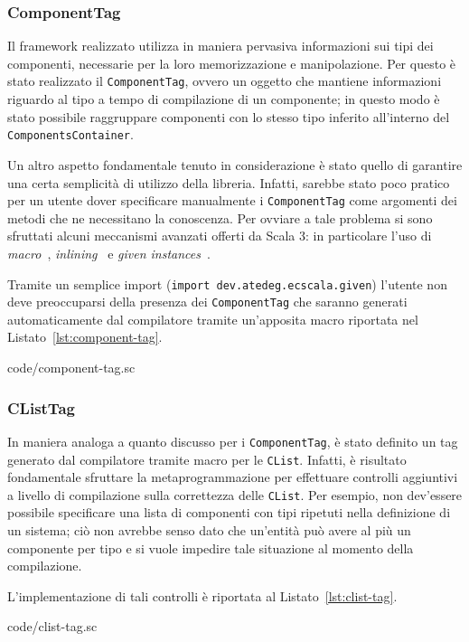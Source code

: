 \subsubsection{ComponentTag}
Il framework realizzato utilizza in maniera pervasiva informazioni sui tipi dei componenti, necessarie
per la loro memorizzazione e manipolazione.
Per questo è stato realizzato il \texttt{ComponentTag}, ovvero un oggetto che mantiene informazioni riguardo
al tipo a tempo di compilazione di un componente;
in questo modo è stato possibile raggruppare componenti con lo stesso tipo inferito all'interno del
\texttt{ComponentsContainer}.

Un altro aspetto fondamentale tenuto in considerazione è stato quello di garantire una certa semplicità di
utilizzo della libreria.
Infatti, sarebbe stato poco pratico per un utente dover specificare manualmente i \texttt{ComponentTag}
come argomenti dei metodi che ne necessitano la conoscenza.
Per ovviare a tale problema si sono sfruttati alcuni meccanismi avanzati offerti da Scala 3:
in particolare l'uso di \textit{macro}~\cite{macros}, \textit{inlining}~\cite{inline}
e \textit{given instances}~\cite{given-instances}.

Tramite un semplice import (\texttt{import dev.atedeg.ecscala.given}) l'utente non deve preoccuparsi
della presenza dei \texttt{ComponentTag} che saranno generati automaticamente dal compilatore tramite
un'apposita macro riportata nel Listato~\ref{lst:component-tag}.


{code/component-tag.sc}

\subsubsection{CListTag}
In maniera analoga a quanto discusso per i \texttt{ComponentTag}, è stato definito un tag generato dal
compilatore tramite macro per le \texttt{CList}.
Infatti, è risultato fondamentale sfruttare la metaprogrammazione per effettuare controlli aggiuntivi
a livello di compilazione sulla correttezza delle \texttt{CList}.
Per esempio, non dev'essere possibile specificare una lista di
componenti con tipi ripetuti nella definizione di un sistema;
ciò non avrebbe senso dato che un'entità può avere al più un componente per tipo e si vuole impedire tale situazione
al momento della compilazione.

L'implementazione di tali controlli è riportata al Listato~\ref{lst:clist-tag}.

{code/clist-tag.sc}

